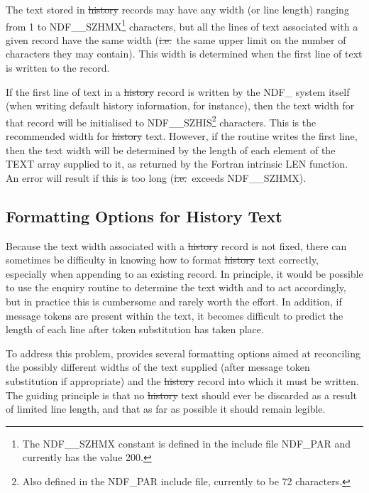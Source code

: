 The text stored in \st{history\/} records may have any width (or line length)
ranging from 1 to NDF\_\_SZHMX\footnote{The NDF\_\_SZHMX constant is
defined in the include file NDF\_PAR and currently has the value 200.}
characters, but all the lines of text associated with a given record
have the same width (\st{i.e.}\ the same upper limit on the number of
characters they may contain). This width is determined when the first
line of text is written to the record.

If the first line of text in a \st{history\/} record is written by the NDF\_
system itself (when writing default history information, for
instance), then the text width for that record will be initialised to
NDF\_\_SZHIS\footnote{Also defined in the NDF\_PAR include file,
currently to be 72 characters.} characters. This is the recommended
width for \st{history\/} text. However, if the  routine writes the
first line, then the text width will be determined by the length of
each element of the TEXT array supplied to it, as returned by the
Fortran intrinsic LEN function. An error will result if this is too
long (\st{i.e.}\ exceeds NDF\_\_SZHMX).

\subsection{Formatting Options for History Text}

Because the text width associated with a \st{history\/} record is not fixed,
there can sometimes be difficulty in knowing how to format \st{history\/}
text correctly, especially when appending to an existing record.  In
principle, it would be possible to use the enquiry routine 
to determine the text width and to act accordingly, but in practice
this is cumbersome and rarely worth the effort. In addition, if
message tokens are present within the text, it becomes difficult to
predict the length of each line after token substitution has taken
place.

To address this problem,  provides several formatting options
aimed at reconciling the possibly different widths of the text
supplied (after message token substitution if appropriate) and the
\st{history\/} record into which it must be written. The guiding principle is
that no \st{history\/} text should ever be discarded as a result of limited
line length, and that as far as possible it should remain legible.


